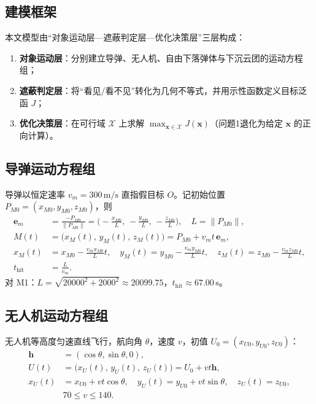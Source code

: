 \documentclass[withoutpreface,bwprint]{cumcmthesis}
\begin{document}
\subsection{建模框架}
本文模型由“对象运动层—遮蔽判定层—优化决策层”三层构成：
\begin{enumerate}
  \item \textbf{对象运动层}：分别建立导弹、无人机、自由下落弹体与下沉云团的运动方程组；
  \item \textbf{遮蔽判定层}：将“看见/看不见”转化为几何不等式，并用示性函数定义目标泛函 $J$；
  \item \textbf{优化决策层}：在可行域 $\mathcal{X}$ 上求解 $\max_{\mathbf{x}\in\mathcal{X}} J(\mathbf{x})$（问题1退化为给定 $\mathbf{x}$ 的正向计算）。
\end{enumerate}

\subsection{导弹运动方程组}
导弹以恒定速率 $v_m=300\,\mathrm{m/s}$ 直指假目标 $O$。记初始位置 $P_{M0}=(x_{M0},y_{M0},z_{M0})$，则
\begin{equation}
\begin{aligned}
\mathbf{e}_m&=\frac{-P_{M0}}{\|P_{M0}\|}
=\Big(-\frac{x_{M0}}{L},\,-\frac{y_{M0}}{L},\,-\frac{z_{M0}}{L}\Big),
\quad L=\|P_{M0}\|,\\
M(t)&=\big(x_M(t),\,y_M(t),\,z_M(t)\big)
=P_{M0}+v_m t\,\mathbf{e}_m,\\
x_M(t)&=x_{M0}-\frac{v_m x_{M0}}{L}t,\quad
y_M(t)=y_{M0}-\frac{v_m y_{M0}}{L}t,\quad
z_M(t)=z_{M0}-\frac{v_m z_{M0}}{L}t,\\
t_{\mathrm{hit}}&=\frac{L}{v_m}.
\end{aligned}
\label{eq:missile-sys}
\end{equation}
对 M1：$L=\sqrt{20000^2+2000^2}\approx 20099.75$，$t_{\mathrm{hit}}\approx 67.00\,\mathrm{s}$。

\subsection{无人机运动方程组}
无人机等高度匀速直线飞行，航向角 $\theta$，速度 $v$，初值 $U_0=(x_{U0},y_{U0},z_{U0})$：
\begin{equation}
\begin{aligned}
\mathbf{h}&=(\cos\theta,\sin\theta,0),\\
U(t)&=\big(x_U(t),\,y_U(t),\,z_U(t)\big)=U_0+vt\mathbf{h},\\
x_U(t)&=x_{U0}+v t\cos\theta,\quad
y_U(t)=y_{U0}+v t\sin\theta,\quad
z_U(t)=z_{U0},\\
&70\le v\le 140.
\end{aligned}
\label{eq:uav-sys}
\end{equation}
\end{document}
